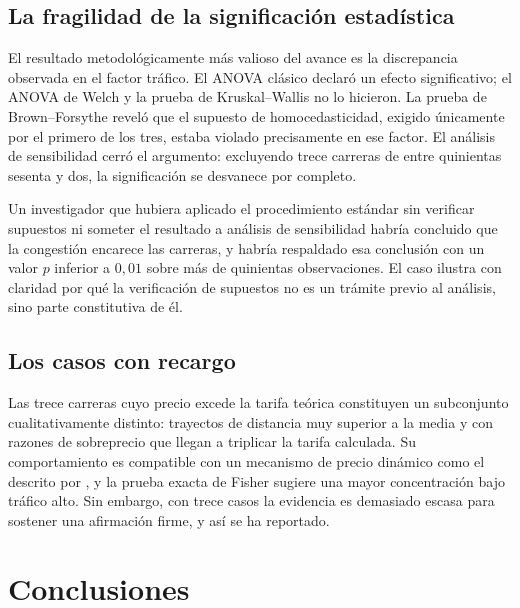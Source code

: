 \documentclass[
]{book}
\begin{document}
\subsection{La fragilidad de la significación estadística}\label{la-fragilidad-de-la-significaciuxf3n-estaduxedstica}

El resultado metodológicamente más valioso del avance es la discrepancia observada en el
factor tráfico. El ANOVA clásico declaró un efecto significativo; el ANOVA de Welch y la
prueba de Kruskal--Wallis no lo hicieron. La prueba de Brown--Forsythe reveló que el supuesto
de homocedasticidad, exigido únicamente por el primero de los tres, estaba violado
precisamente en ese factor. El análisis de sensibilidad cerró el argumento: excluyendo trece
carreras de entre quinientas sesenta y dos, la significación se desvanece por completo.

Un investigador que hubiera aplicado el procedimiento estándar sin verificar supuestos ni
someter el resultado a análisis de sensibilidad habría concluido que la congestión encarece
las carreras, y habría respaldado esa conclusión con un valor \(p\) inferior a \(0{,}01\) sobre
más de quinientas observaciones. El caso ilustra con claridad por qué la verificación de
supuestos no es un trámite previo al análisis, sino parte constitutiva de él.

\subsection{Los casos con recargo}\label{los-casos-con-recargo}

Las trece carreras cuyo precio excede la tarifa teórica constituyen un subconjunto
cualitativamente distinto: trayectos de distancia muy superior a la media y con razones de
sobreprecio que llegan a triplicar la tarifa calculada. Su comportamiento es compatible con un
mecanismo de precio dinámico como el descrito por \citet{cachon2017}, y la prueba exacta de Fisher
sugiere una mayor concentración bajo tráfico alto. Sin embargo, con trece casos la evidencia
es demasiado escasa para sostener una afirmación firme, y así se ha reportado.

\section{Conclusiones}\label{conclusiones}
\end{document}
